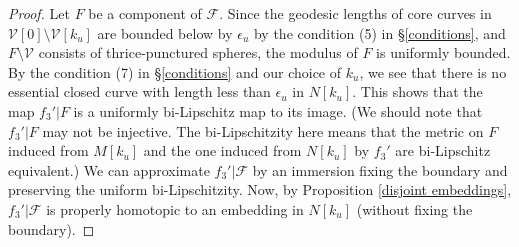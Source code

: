 \documentclass{amsart}
\theoremstyle{definition}
\numberwithin{figure}{section}
\numberwithin{equation}{section}
\def\cv{\mathcal{V}}
\begin{document}
\begin{proof}
Let $F$ be a component of $\mathcal F$.
Since the geodesic lengths of core curves in $\cv[0] \setminus \cv[k_u]$  are bounded below by $\epsilon_u$ by the condition (5) in \S \ref{conditions}, and $F \setminus \cv$ consists of thrice-punctured spheres, the modulus of $F$ is uniformly bounded.
By the condition (7) in \S \ref{conditions} and our choice of $k_u$, we see that there is no essential closed curve with length less than $\epsilon_u$ in $N[k_u]$.
This shows that the map $f_3'|F$ is a uniformly bi-Lipschitz map to its image.
(We should note that $f_3'|F$ may not be injective.
The bi-Lipschitzity here means that the metric on $F$ induced from $M[k_u]$ and the one induced from $N[k_u]$ by $f_3'$ are bi-Lipschitz equivalent.)
We can approximate $f_3'|\mathcal F$ by an immersion fixing the boundary and preserving the uniform bi-Lipschitzity.
Now, by Proposition \ref{disjoint embeddings}, $f_3'|\mathcal F$ is properly homotopic to an embedding in $N[k_u]$ (without fixing the boundary).
   

\end{proof}
\end{document}
